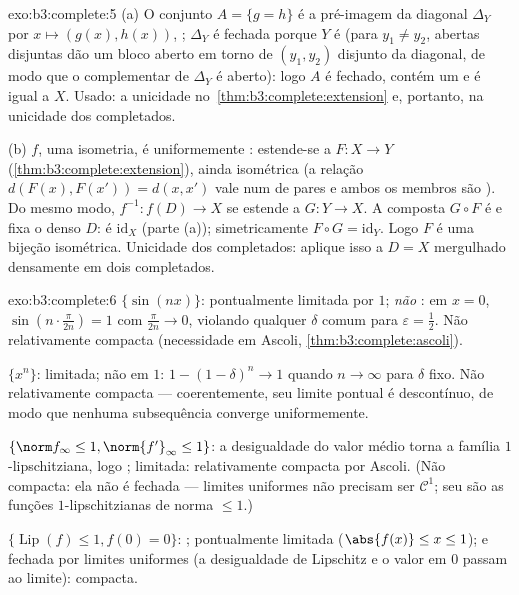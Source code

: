 \begin{solution}{exo:b3:complete:5}
(a) O conjunto $A = \{g = h\}$ é a pré-imagem da diagonal
$\Delta_Y$ por $x \mapsto (g(x), h(x))$, ; $\Delta_Y$
é fechada porque $Y$ é  (para $y_1 \neq y_2$,
 abertas disjuntas dão um bloco aberto em torno de $(y_1,
y_2)$ disjunto da diagonal, de modo que o complementar de
$\Delta_Y$ é aberto): logo $A$ é
fechado, contém um  e é igual a $X$. Usado: a unicidade no~\cref{thm:b3:complete:extension} e, portanto, na unicidade dos
completados.

(b) $f$, uma isometria, é uniformemente : estende-se a
$F\colon X \to Y$ (\cref{thm:b3:complete:extension}), ainda
isométrica (a relação $d(F(x), F(x')) = d(x, x')$ vale num  de pares e ambos os membros são ). Do mesmo modo,
$f^{-1}\colon f(D) \to X$ se estende a $G \colon Y \to X$. A
composta $G \circ F$ é  e fixa o denso $D$: é
$\mathrm{id}_X$ (parte (a)); simetricamente $F \circ G =
\mathrm{id}_Y$. Logo $F$ é uma bijeção isométrica. Unicidade dos
completados: aplique isso a $D = X$ mergulhado densamente em dois
completados.
\end{solution}

\begin{solution}{exo:b3:complete:6}
$\{\sin(nx)\}$: pontualmente limitada por $1$; \emph{não}
: em $x = 0$, $\sin(n\cdot\frac{\pi}{2n}) = 1$
com $\frac\pi{2n} \to 0$, violando qualquer $\delta$ comum para
$\varepsilon = \frac12$. Não relativamente compacta (necessidade em
Ascoli, \cref{thm:b3:complete:ascoli}).

$\{x^n\}$: limitada; não  em $1$: $1 - (1 -
\delta)^n \to 1$ quando $n \to \infty$ para $\delta$ fixo. Não
relativamente compacta --- coerentemente, seu limite pontual é
descontínuo, de modo que nenhuma subsequência converge uniformemente.

$\{\norm f_\infty \leq 1, \norm{f'}_\infty \leq 1\}$: a desigualdade do valor
médio torna a família $1$-lipschitziana, logo
; limitada: relativamente compacta por Ascoli. (Não
compacta: ela não é fechada --- limites uniformes não precisam ser
$\mathcal C^1$; seu  são as funções $1$-lipschitzianas de
norma $\leq 1$.)

$\{\operatorname{Lip}(f) \leq 1, f(0) = 0\}$: ;
pontualmente limitada ($\abs{f(x)} \leq x \leq 1$); e fechada
por limites uniformes (a desigualdade de Lipschitz e o valor em
$0$ passam ao limite): compacta.
\end{solution}

